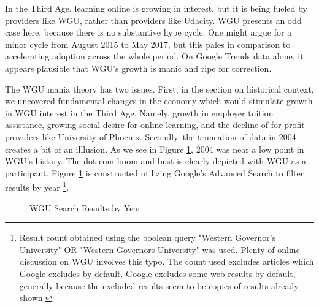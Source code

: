 \documentclass[review]{elsarticle}
\begin{document}
    In the Third Age, learning online is growing in interest, but it is being fueled by providers
    like WGU, rather than providers like Udacity.
    WGU presents an odd case here, because there is no substantive hype cycle.
    One might argue for a minor cycle from August 2015 to May 2017, but this pales in comparison to accelerating adoption across the whole period.
    On Google Trends data alone, it appears plausible that WGU's growth is manic and ripe for correction.

    The WGU mania theory has two issues.
    First, in the section on historical context, we uncovered fundamental changes in the economy which would stimulate growth in WGU interest in the Third Age.
    Namely, growth in employer tuition assistance, growing social desire for online learning,
    and the decline of for-profit providers like University of Phoenix.
    Secondly, the truncation of data in 2004 creates a bit of an illlusion.
    As we see in Figure \ref{fig:wgu_search_results}, 2004 was near a low point in WGU's history.
    The dot-com boom and bust is clearly depicted with WGU as a participant.
    Figure \ref{fig:wgu_search_results} is constructed utilizing Google's Advanced Search to filter results by year
    \footnote{
        Result count obtained using the boolean query "Western Governor's University" OR "Western Governors University" was used.
        Plenty of online discussion on WGU involves this typo.
        The count used excludes articles which Google excludes by default.
        Google excludes some web results by default, generally because the excluded results seem to be copies of results already shown.
    }.

    \begin{figure}[h!]
        \centering
        \caption{WGU Search Results by Year}
    

        \label{fig:wgu_search_results}
        \end{figure}
    
\end{document}
